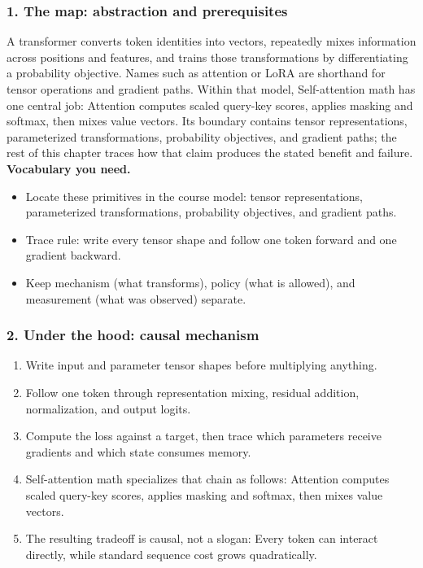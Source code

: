 \subsubsection*{1. The map: abstraction and prerequisites}
A transformer converts token identities into vectors, repeatedly mixes information across positions and features, and trains those transformations by differentiating a probability objective. Names such as attention or LoRA are shorthand for tensor operations and gradient paths.
Within that model, Self-attention math has one central job: Attention computes scaled query-key scores, applies masking and softmax, then mixes value vectors. Its boundary contains tensor representations, parameterized transformations, probability objectives, and gradient paths; the rest of this chapter traces how that claim produces the stated benefit and failure.
\textbf{Vocabulary you need.}\begin{itemize}
\item Locate these primitives in the course model: tensor representations, parameterized transformations, probability objectives, and gradient paths.
\item Trace rule: write every tensor shape and follow one token forward and one gradient backward.
\item Keep mechanism (what transforms), policy (what is allowed), and measurement (what was observed) separate.
\end{itemize}
\subsubsection*{2. Under the hood: causal mechanism}\begin{enumerate}
\item Write input and parameter tensor shapes before multiplying anything.
\item Follow one token through representation mixing, residual addition, normalization, and output logits.
\item Compute the loss against a target, then trace which parameters receive gradients and which state consumes memory.
\item Self-attention math specializes that chain as follows: Attention computes scaled query-key scores, applies masking and softmax, then mixes value vectors.
\item The resulting tradeoff is causal, not a slogan: Every token can interact directly, while standard sequence cost grows quadratically.
\end{enumerate}
